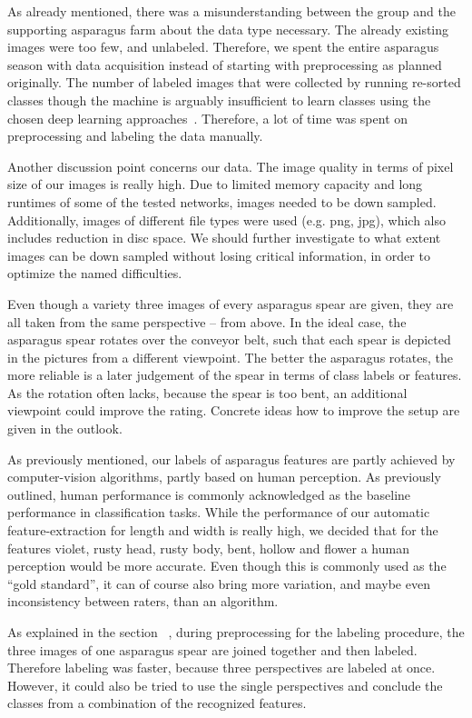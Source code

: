 \bigskip
As already mentioned, there was a misunderstanding between the group and the supporting asparagus farm about the data type necessary. The already existing images were too few, and unlabeled. Therefore, we spent the entire asparagus season with data acquisition instead of starting with preprocessing as planned originally. The number of labeled images that were collected by running re-sorted classes though the machine is arguably insufficient to learn classes using the chosen deep learning approaches~\citep{russakovsky2013detecting,russakovsky2010attribute,how_many_images}. Therefore, a lot of time was spent on preprocessing and labeling the data manually.

Another discussion point concerns our data. The image quality in terms of pixel size of our images is really high. Due to limited memory capacity and long runtimes of some of the tested networks, images needed to be down sampled. Additionally, images of different file types were used (e.g. png, jpg), which also includes reduction in disc space. We should further investigate to what extent images can be down sampled without losing critical information, in order to optimize the named difficulties.

Even though a variety three images of every asparagus spear are given, they are all taken from the same perspective – from above. In the ideal case, the asparagus spear rotates over the conveyor belt, such that each spear is depicted in the pictures from a different viewpoint. The better the asparagus rotates, the more reliable is a later judgement of the spear in terms of class labels or features. As the rotation often lacks, because the spear is too bent, an additional viewpoint could improve the rating. Concrete ideas how to improve the setup are given in the outlook.

As previously mentioned, our labels of asparagus features are partly achieved by computer-vision algorithms, partly based on human perception. As previously outlined, human performance is commonly acknowledged as the baseline performance in classification tasks. While the performance of our automatic feature-extraction for length and width is really high, we decided that for the features violet, rusty head, rusty body, bent, hollow and flower a human perception would be more accurate. Even though this is commonly used as the \enquote{gold standard}, it can of course also bring more variation, and maybe even inconsistency between raters, than an algorithm. 

As explained in the section ~, during preprocessing for the labeling procedure, the three images of one asparagus spear are joined together and then labeled. Therefore labeling was faster, because three perspectives are labeled at once. However, it could also be tried to use the single perspectives and conclude the classes from a combination of the recognized features.

